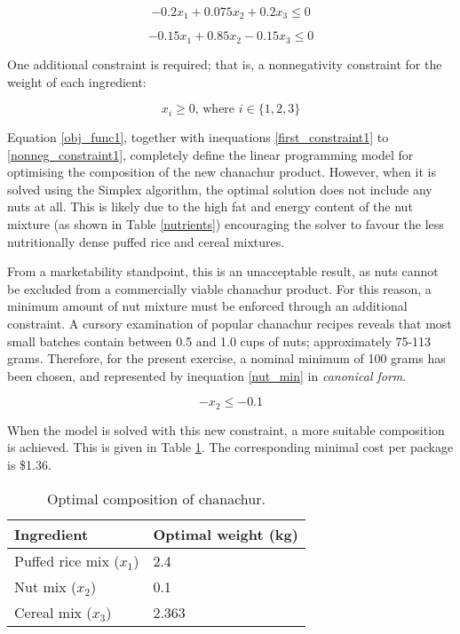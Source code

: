 \documentclass[11pt, a4paper]{article}
\begin{document}
    \begin{equation}
        -0.2x_1 + 0.075x_2 + 0.2x_3 \leq 0
    \end{equation}

    \begin{equation}
        -0.15x_1 + 0.85x_2 - 0.15x_3 \leq 0
        \label{last_constraint1}
    \end{equation}

    One additional constraint is required; that is, a nonnegativity constraint for the weight of each ingredient:

    \begin{equation}
        x_i \geq 0 \textrm{, where } i \in \{1, 2, 3\}
        \label{nonneg_constraint1}
    \end{equation}

    Equation \ref{obj_func1}, together with inequations \ref{first_constraint1} to \ref{nonneg_constraint1}, completely define the linear programming model for optimising the composition of the new chanachur product. However, when it is solved using the Simplex algorithm, the optimal solution does not include any nuts at all. This is likely due to the high fat and energy content of the nut mixture (as shown in Table \ref{nutrients}) encouraging the solver to favour the less nutritionally dense puffed rice and cereal mixtures.

    From a marketability standpoint, this is an unacceptable result, as nuts cannot be excluded from a commercially viable chanachur product. For this reason, a minimum amount of nut mixture must be enforced through an additional constraint. A cursory examination of popular chanachur recipes reveals that most small batches contain between 0.5 and 1.0 cups of nuts; approximately 75-113 grams. Therefore, for the present exercise, a nominal minimum of 100 grams has been chosen, and represented by inequation \ref{nut_min} in \textit{canonical form}.

    \begin{equation}
        -x_2 \leq -0.1
        \label{nut_min}
    \end{equation}

    When the model is solved with this new constraint, a more suitable composition is achieved. This is given in Table \ref{results1}. The corresponding minimal cost per package is \$1.36.

    \begin{table}[!ht]
        \centering
        \caption{Optimal composition of chanachur.}
        \begin{tabular}{|l|l|}
            \hline
            Ingredient                  & Optimal weight (kg)   \\ \hline
            Puffed rice mix ($x_1$)     & 2.4                   \\ \hline
            Nut mix ($x_2$)             & 0.1                   \\ \hline
            Cereal mix ($x_3$)          & 2.363                 \\ \hline          
        \end{tabular}
        \label{results1}
    \end{table}
\end{document}
